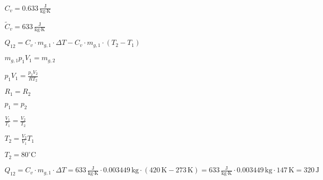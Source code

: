\( C_v = 0.633 \, \frac{\text{J}}{\text{kg·K}} \)  

\( \tilde{C}_v = 633 \, \frac{\text{J}}{\text{kg·K}} \)  

\( Q_{12} = C_v \cdot m_{g,1} \cdot \Delta T - C_v \cdot m_{g,1} \cdot (T_2 - T_1) \)  

\( m_{g,1} p_1 V_1 = m_{g,2} \)  

\( p_1 V_1 = \frac{p_2 V_2}{R T_2} \)  

\( R_1 = R_2 \)  

\( p_1 = p_2 \)  

\( \frac{V_1}{T_1} = \frac{V_2}{T_2} \)  

\( T_2 = \frac{V_2}{V_1} T_1 \)  

\( T_2 = 80^\circ \text{C} \)  

\( Q_{12} = C_v \cdot m_{g,1} \cdot \Delta T = 633 \, \frac{\text{J}}{\text{kg·K}} \cdot 0.003449 \, \text{kg} \cdot (420 \, \text{K} - 273 \, \text{K}) = 633 \, \frac{\text{J}}{\text{kg·K}} \cdot 0.003449 \, \text{kg} \cdot 147 \, \text{K} = 320 \, \text{J} \)